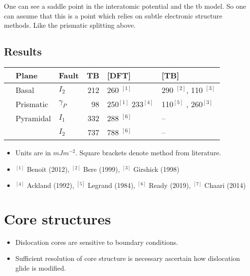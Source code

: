 \documentclass[11pt]{article}
\begin{document}
\begin{notes}


One can see a saddle point in the interatomic potential and the tb model. So
one can assume that this is a point which relies on subtle electronic
structure methods. Like the prismatic splitting above. 
\end{notes}

\subsection*{Results}
\label{sec:orgd60c7e8}
\begin{center}
\begin{tabular}{lllrll}
 & Plane & Fault & TB & [DFT] & [TB]\\
\hline
 & Basal & \(I_{2}\) & 212 & 260 \(^{[1]}\) & 290 \(^{[2]}\), 110 \(^{[3]}\)\\
\hline
 & Prismatic & \(\gamma_{P}\) & 98 & 250\(^{[1]}\) 233\(^{[4]}\) & 110\(^{[5]}\) ,  260\(^{[3]}\)\\
\hline
 & Pyramidal & \(I_{1}\) & 332 & 288 \(^{[6]}\) & --\\
 &  & \(I_{2}\) & 737 & 788 \(^{[6]}\) & --\\
\end{tabular}
\end{center}


\begin{itemize}
\item Units are in \(mJm^{-2}\). Square brackets denote method from literature.
\item \(^{[1]}\) Benoit (2012), \(^{[2]}\) Bere (1999), \(^{[3]}\) Girshick (1998)
\item \(^{[4]}\) Ackland (1992), \(^{[5]}\) Legrand (1984), \(^{[6]}\) Ready (2019), \(^{[7]}\) Chaari (2014)
\end{itemize}




\section*{Core structures}
\label{sec:orgd30dacd}
\begin{itemize}
\item Dislocation cores are sensitive to boundary conditions.
\item Sufficient resolution of core structure is necessary ascertain how
dislocation glide is modified.
\end{itemize}
\end{document}
